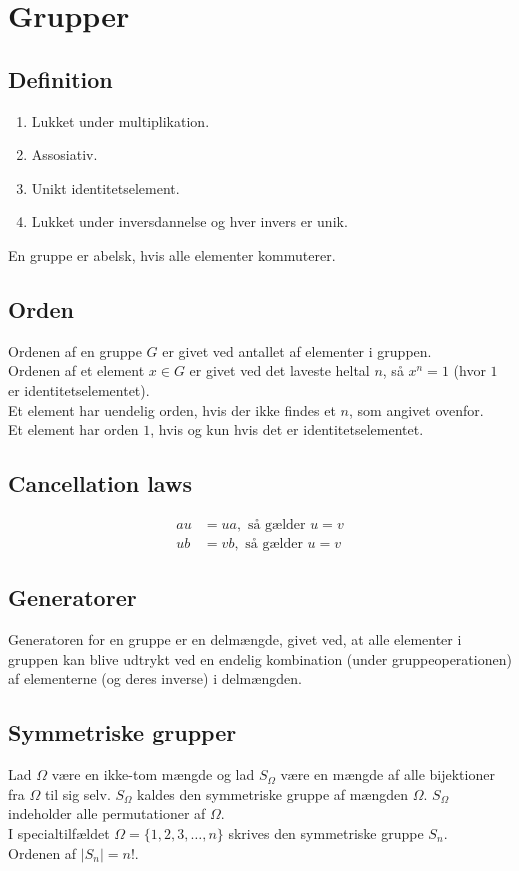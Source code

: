 \documentclass[11pt]{article}
\begin{document}
\section*{Grupper}
\subsection*{Definition}
\begin{enumerate}
  \item Lukket under multiplikation.
  \item Assosiativ.
  \item Unikt identitetselement.
  \item Lukket under inversdannelse og hver invers er unik.
\end{enumerate}

En gruppe er abelsk, hvis alle elementer kommuterer.
\subsection*{Orden}
Ordenen af en gruppe $G$ er givet ved antallet af elementer i gruppen.\\
Ordenen af et element $x \in G$ er givet ved det laveste heltal $n$, så $x^n = 1$ (hvor $1$ er identitetselementet).\\
Et element har uendelig orden, hvis der ikke findes et $n$, som angivet ovenfor.\\
Et element har orden $1$, hvis og kun hvis det er identitetselementet.

\subsection*{Cancellation laws}
\begin{align*}
  au &= ua, \text{ så gælder } u = v\\
  ub &= vb, \text{ så gælder } u = v
\end{align*}
\subsection*{Generatorer}
Generatoren for en gruppe er en delmængde, givet ved, at alle elementer i gruppen kan blive udtrykt ved en endelig kombination (under gruppeoperationen) af elementerne (og deres inverse) i delmængden.
\subsection*{Symmetriske grupper}
Lad $\Omega$ være en ikke-tom mængde og lad $S_{\Omega}$ være en mængde af alle bijektioner fra $\Omega$ til sig selv. $S_{\Omega}$ kaldes den symmetriske gruppe af mængden $\Omega$. $S_{\Omega}$ indeholder alle permutationer af $\Omega$.\\
I specialtilfældet $\Omega = \{ 1,2,3, \hdots, n \}$ skrives den symmetriske gruppe $S_n$.\\
Ordenen af $|S_n| = n!$.
\end{document}
